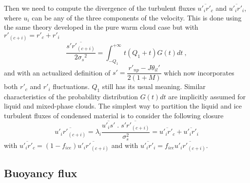 Then we need to compute the divergence of the  turbulent fluxes 
$\overline{{u'_{i}}{r'_{c}}}$ and
$\overline{{u'_{i}}{r'_{i}}}$, where $u_{i}$ can be any of the three components
of the velocity. This is done using the same theory developed in the pure warm 
cloud case but with $r'_{(c+i)}=r'_{c}+r'_{i}$
\begin{equation}\label{eqn:s'rc+i'}
\dfrac{\overline{{s'}{r'_{(c+i)}}}}{2{{\sigma}_{s}}^2} =
\int_{-Q_{1}}^{+\infty} t(Q_{1}+t)G(t) dt~,
\end{equation}
and with an actualized definition of 
$s' = \dfrac {r'_{np} - J \theta_{il}'} {2(1+M)}$ which now incorporates both 
$r'_c$ and $r'_i$ fluctuations. $Q_1$ still has its usual meaning. Similar 
characteristics of the probability distribution $G(t)dt$ are implicitly assumed
for liquid and mixed-phase clouds. The simplest way to partition the liquid and
ice turbulent fluxes of condensed material is to consider the following closure
\begin{equation}
\overline{{u'_{i}}{r'_{(c+i)}}}=\lambda_i \dfrac{\overline{u'_i s'}\;.\;\overline{s' r'_{(c+i)}}}{\sigma_s^2} = \overline{{u'_{i}}{r'_{c}}}+\overline{{u'_{i}}{r'_{i}}}
\end{equation}
with $\overline{{u'_{i}}{r'_{c}}} = (1-f_{ice})\overline{{u'_{i}} r'_{(c+i)}}$ 
and
with $\overline{{u'_{i}}{r'_{i}}} =    f_{ice} \overline{{u'_{i}} r'_{(c+i)}}$.


\subsection{Buoyancy flux}

